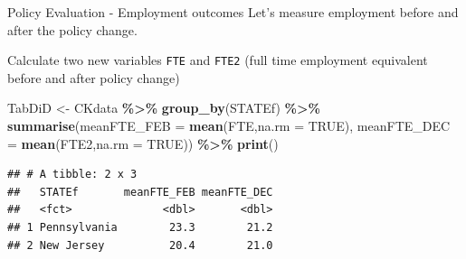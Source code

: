 \documentclass[
  ignorenonframetext,
]{beamer}
\newenvironment{Shaded}{\begin{snugshade}}{\end{snugshade}}
\newcommand{\AttributeTok}[1]{\textcolor[rgb]{0.13,0.29,0.53}{#1}}
\newcommand{\ConstantTok}[1]{\textcolor[rgb]{0.56,0.35,0.01}{#1}}
\newcommand{\FloatTok}[1]{\textcolor[rgb]{0.00,0.00,0.81}{#1}}
\newcommand{\FunctionTok}[1]{\textcolor[rgb]{0.13,0.29,0.53}{\textbf{#1}}}
\newcommand{\NormalTok}[1]{#1}
\newcommand{\OtherTok}[1]{\textcolor[rgb]{0.56,0.35,0.01}{#1}}
\newcommand{\SpecialCharTok}[1]{\textcolor[rgb]{0.81,0.36,0.00}{\textbf{#1}}}
\begin{document}
\begin{frame}[fragile]{Policy Evaluation - Employment outcomes}
\label{policy-evaluation---employment-outcomes}
Let's measure employment before and after the policy change.

Calculate two new variables \texttt{FTE} and \texttt{FTE2} (full time
employment equivalent before and after policy change)

\footnotesize

\begin{Shaded}
\end{Shaded}

\begin{Shaded}
\begin{Highlighting}[]
\NormalTok{TabDiD }\OtherTok{\textless{}{-}}\NormalTok{ CKdata }\SpecialCharTok{\%\textgreater{}\%} \FunctionTok{group\_by}\NormalTok{(STATEf) }\SpecialCharTok{\%\textgreater{}\%} 
          \FunctionTok{summarise}\NormalTok{(}\AttributeTok{meanFTE\_FEB =} \FunctionTok{mean}\NormalTok{(FTE,}\AttributeTok{na.rm =} \ConstantTok{TRUE}\NormalTok{), }
                    \AttributeTok{meanFTE\_DEC =} \FunctionTok{mean}\NormalTok{(FTE2,}\AttributeTok{na.rm =} \ConstantTok{TRUE}\NormalTok{)) }\SpecialCharTok{\%\textgreater{}\%} 
          \FunctionTok{print}\NormalTok{()}
\end{Highlighting}
\end{Shaded}

\begin{verbatim}
## # A tibble: 2 x 3
##   STATEf       meanFTE_FEB meanFTE_DEC
##   <fct>              <dbl>       <dbl>
## 1 Pennsylvania        23.3        21.2
## 2 New Jersey          20.4        21.0
\end{verbatim}

\normalsize
\end{frame}
\end{document}
